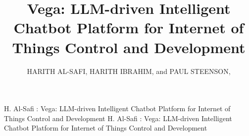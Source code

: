 \documentclass{ieeeaccess}
\begin{document}

\title{Vega: LLM-driven Intelligent Chatbot Platform for Internet of Things Control and Development}
\author{\uppercase{Harith Al-Safi},
    \uppercase{Harith Ibrahim}, and {\uppercase{Paul Steenson},
    }}

\address{School of Electronics and Electrical Engineering, University of Leeds,
    Leeds LS2 9JT, U.K}

\markboth
{H. Al-Safi \headeretal: Vega: LLM-driven Intelligent Chatbot Platform for Internet of Things Control and Development}
{H. Al-Safi \headeretal: Vega: LLM-driven Intelligent Chatbot Platform for Internet of Things Control and Development}

\end{document}
